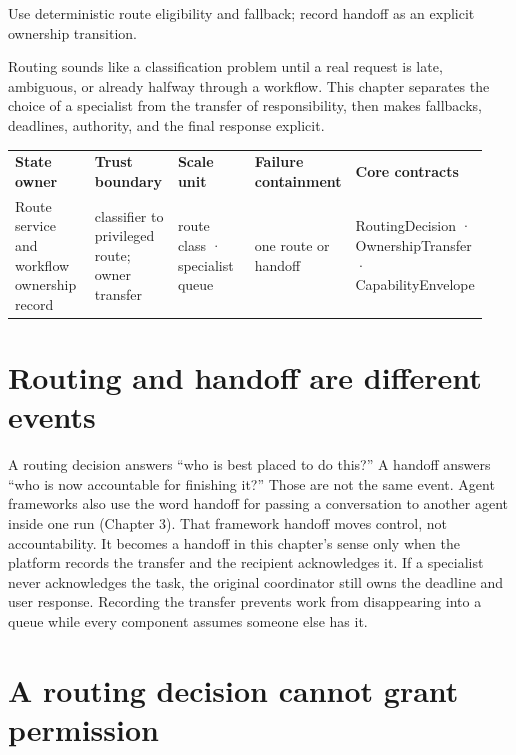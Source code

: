 \begin{bookcallout}
Use deterministic route eligibility and fallback; record handoff as an explicit ownership transition.
\end{bookcallout}

Routing sounds like a classification problem until a real request is late, ambiguous, or already halfway through a workflow. This chapter separates the choice of a specialist from the transfer of responsibility, then makes fallbacks, deadlines, authority, and the final response explicit.\par

\BookTableStart
\fontsize{7.2}{9}\selectfont
\begin{tabular}{@{}Y{0.1880\linewidth}Y{0.1880\linewidth}Y{0.1880\linewidth}Y{0.1880\linewidth}Y{0.1880\linewidth}@{}}
\color{white}\bfseries \textbf{State owner} & \color{white}\bfseries \textbf{Trust boundary} & \color{white}\bfseries \textbf{Scale unit} & \color{white}\bfseries \textbf{Failure containment} & \color{white}\bfseries \textbf{Core contracts} \\
Route service and workflow ownership record & classifier to privileged route; owner transfer & route class · specialist queue & one route or handoff & RoutingDecision · OwnershipTransfer · CapabilityEnvelope \\
\end{tabular}
\BookTableEnd

\section{Routing and handoff are different events}

A routing decision answers “who is best placed to do this?” A handoff answers “who is now accountable for finishing it?” Those are not the same event. Agent frameworks also use the word handoff for passing a conversation to another agent inside one run (Chapter 3). That framework handoff moves control, not accountability. It becomes a handoff in this chapter's sense only when the platform records the transfer and the recipient acknowledges it. If a specialist never acknowledges the task, the original coordinator still owns the deadline and user response. Recording the transfer prevents work from disappearing into a queue while every component assumes someone else has it.\par

\section{A routing decision cannot grant permission}

